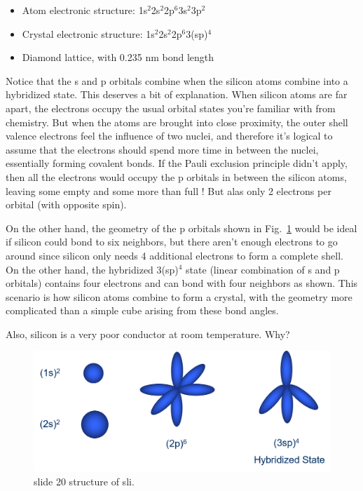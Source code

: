 \begin{itemize}
\item    Atom electronic structure: 1s$^2$2s$^2$2p$^6$3s$^2$3p$^2$
\item   Crystal electronic structure: 1s$^2$2s$^2$2p$^6$3(sp)$^4$
\item    Diamond lattice, with 0.235 nm bond length
\end{itemize}
   
Notice that the s and p orbitals combine when the silicon atoms combine into a hybridized state.  This deserves a bit of explanation.  When silicon atoms are far apart, the electrons occupy the usual orbital states you're familiar with from chemistry.  But when the atoms are brought into close proximity, the outer shell valence electrons feel the influence of two nuclei, and therefore it's logical to assume that the electrons should spend more time in between the nuclei, essentially forming covalent bonds.  If the Pauli exclusion principle didn't apply, then all the electrons would occupy the p orbitals in between the silicon atoms, leaving some empty and some more than full !  But alas only 2 electrons per orbital (with opposite spin).

On the other hand, the geometry of the p orbitals shown in Fig.~\ref{fig:slide20} would be ideal if silicon could bond to six neighbors, but there aren't enough electrons to go around since silicon only needs 4 additional electrons to form a complete shell.  On the other hand, the hybridized 3(sp)$^4$ state (linear combination of s and p orbitals) contains four electrons and can bond with four neighbors as shown.  This scenario is how silicon atoms combine to form a crystal, with the geometry more complicated than a simple cube  arising from these bond angles.


Also, silicon is a very poor conductor at room temperature. Why?
 
\begin{figure}
\begin{center}
\includegraphics[width=.5\columnwidth]{slide20}
\end{center}
\caption{slide 20 structure of sli. } \label{fig:slide20}
\end{figure}

